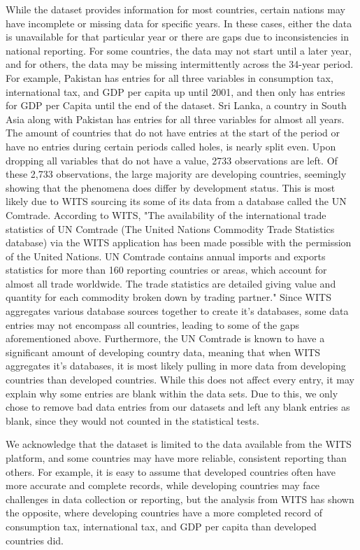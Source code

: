 \documentclass[12pt]{article}
\begin{document}
While the dataset provides information for most countries, certain nations may have incomplete or missing data for specific years. In these cases, either the data is unavailable for that particular year or there are gaps due to inconsistencies in national reporting. For some countries, the data may not start until a later year, and for others, the data may be missing intermittently across the 34-year period. For example, Pakistan has entries for all three variables in consumption tax, international tax, and GDP per capita up until 2001, and then only has entries for GDP per Capita until the end of the dataset. Sri Lanka, a country in South Asia along with Pakistan has entries for all three variables for almost all years. The amount of countries that do not have entries at the start of the period or have no entries during certain periods called holes, is nearly split even. Upon dropping all variables that do not have a value, 2733 observations are left. Of these 2,733 observations, the large majority are developing countries, seemingly showing that the phenomena does differ by development status. This is most likely due to WITS sourcing its some of its data from a database called the UN Comtrade. According to WITS, "The availability of the international trade statistics of UN Comtrade (The United Nations Commodity Trade Statistics database) via the WITS application has been made possible with the permission of the United Nations. UN Comtrade contains annual imports and exports statistics for more than 160 reporting countries or areas, which account for almost all trade worldwide. The trade statistics are detailed giving value and quantity for each commodity broken down by trading partner." Since WITS aggregates various database sources together to create it's databases, some data entries may not encompass all countries, leading to some of the gaps aforementioned above. Furthermore, the UN Comtrade is known to have a significant amount of developing country data, meaning that when WITS aggregates it's databases, it is most likely pulling in more data from developing countries than developed countries. While this does not affect every entry, it may explain why some entries are blank within the data sets. Due to this, we only chose to remove bad data entries from our datasets and left any blank entries as blank, since they would not counted in the statistical tests. 

We acknowledge that the dataset is limited to the data available from the WITS platform, and some countries may have more reliable, consistent reporting than others. For example, it is easy to assume that developed countries often have more accurate and complete records, while developing countries may face challenges in data collection or reporting, but the analysis from WITS has shown the opposite, where developing countries have a more completed record of consumption tax, international tax, and GDP per capita than developed countries did. 
\end{document}
